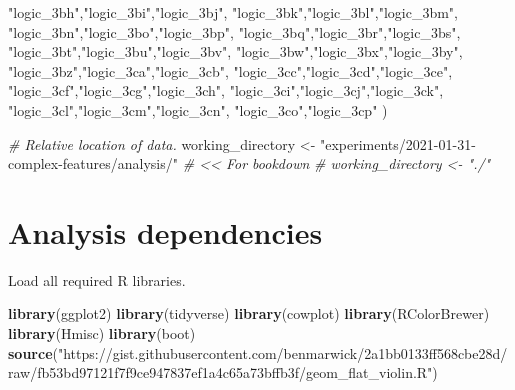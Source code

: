 \documentclass[]{book}
\newenvironment{Shaded}{\begin{snugshade}}{\end{snugshade}}
\newcommand{\CommentTok}[1]{\textcolor[rgb]{0.56,0.35,0.01}{\textit{#1}}}
\newcommand{\KeywordTok}[1]{\textcolor[rgb]{0.13,0.29,0.53}{\textbf{#1}}}
\newcommand{\NormalTok}[1]{#1}
\newcommand{\StringTok}[1]{\textcolor[rgb]{0.31,0.60,0.02}{#1}}
\begin{document}
\begin{Shaded}
\begin{Highlighting}[]
  \StringTok{"logic_3bh"}\NormalTok{,}\StringTok{"logic_3bi"}\NormalTok{,}\StringTok{"logic_3bj"}\NormalTok{,}
  \StringTok{"logic_3bk"}\NormalTok{,}\StringTok{"logic_3bl"}\NormalTok{,}\StringTok{"logic_3bm"}\NormalTok{,}
  \StringTok{"logic_3bn"}\NormalTok{,}\StringTok{"logic_3bo"}\NormalTok{,}\StringTok{"logic_3bp"}\NormalTok{,}
  \StringTok{"logic_3bq"}\NormalTok{,}\StringTok{"logic_3br"}\NormalTok{,}\StringTok{"logic_3bs"}\NormalTok{,}
  \StringTok{"logic_3bt"}\NormalTok{,}\StringTok{"logic_3bu"}\NormalTok{,}\StringTok{"logic_3bv"}\NormalTok{,}
  \StringTok{"logic_3bw"}\NormalTok{,}\StringTok{"logic_3bx"}\NormalTok{,}\StringTok{"logic_3by"}\NormalTok{,}
  \StringTok{"logic_3bz"}\NormalTok{,}\StringTok{"logic_3ca"}\NormalTok{,}\StringTok{"logic_3cb"}\NormalTok{,}
  \StringTok{"logic_3cc"}\NormalTok{,}\StringTok{"logic_3cd"}\NormalTok{,}\StringTok{"logic_3ce"}\NormalTok{,}
  \StringTok{"logic_3cf"}\NormalTok{,}\StringTok{"logic_3cg"}\NormalTok{,}\StringTok{"logic_3ch"}\NormalTok{,}
  \StringTok{"logic_3ci"}\NormalTok{,}\StringTok{"logic_3cj"}\NormalTok{,}\StringTok{"logic_3ck"}\NormalTok{,}
  \StringTok{"logic_3cl"}\NormalTok{,}\StringTok{"logic_3cm"}\NormalTok{,}\StringTok{"logic_3cn"}\NormalTok{,}
  \StringTok{"logic_3co"}\NormalTok{,}\StringTok{"logic_3cp"}
\NormalTok{)}

\CommentTok{# Relative location of data.}
\NormalTok{working_directory <-}\StringTok{ "experiments/2021-01-31-complex-features/analysis/"} \CommentTok{# << For bookdown}
\CommentTok{# working_directory <- "./"}
\end{Highlighting}
\end{Shaded}

\hypertarget{analysis-dependencies-2}{%
\section{Analysis dependencies}\label{analysis-dependencies-2}}

Load all required R libraries.

\begin{Shaded}
\begin{Highlighting}[]
\KeywordTok{library}\NormalTok{(ggplot2)}
\KeywordTok{library}\NormalTok{(tidyverse)}
\KeywordTok{library}\NormalTok{(cowplot)}
\KeywordTok{library}\NormalTok{(RColorBrewer)}
\KeywordTok{library}\NormalTok{(Hmisc)}
\KeywordTok{library}\NormalTok{(boot)}
\KeywordTok{source}\NormalTok{(}\StringTok{"https://gist.githubusercontent.com/benmarwick/2a1bb0133ff568cbe28d/raw/fb53bd97121f7f9ce947837ef1a4c65a73bffb3f/geom_flat_violin.R"}\NormalTok{)}
\end{Highlighting}
\end{Shaded}
\end{document}
